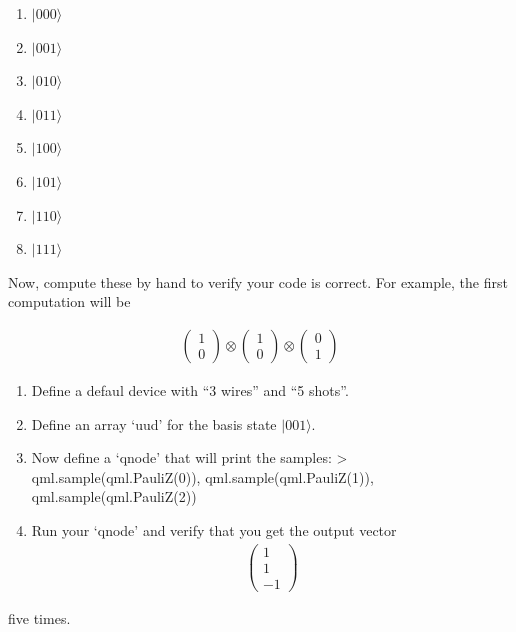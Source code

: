 \documentclass[11pt]{article}
\providecommand{\tightlist}{%
      \setlength{\itemsep}{0pt}\setlength{\parskip}{0pt}}
\begin{document}
\begin{enumerate}
\def\labelenumi{\arabic{enumi}.}
\tightlist
\item
  \(|000 \rangle\)
\item
  \(|001 \rangle\)
\item
  \(|010 \rangle\)
\item
  \(|011 \rangle\)
\item
  \(|100 \rangle\)
\item
  \(|101 \rangle\)
\item
  \(|110 \rangle\)
\item
  \(|111 \rangle\)
\end{enumerate}

Now, compute these by hand to verify your code is correct. For example,
the first computation will be

\begin{align}
\begin{pmatrix} 1\\0 \end{pmatrix} \otimes
\begin{pmatrix} 1\\0 \end{pmatrix} \otimes
\begin{pmatrix} 0\\1 \end{pmatrix}
\end{align}

    \begin{enumerate}
\def\labelenumi{\arabic{enumi}.}
\setcounter{enumi}{8}
\tightlist
\item
  Define a defaul device with ``3 wires'' and ``5 shots''.
\item
  Define an array `uud' for the basis state \(|001\rangle\).
\item
  Now define a `qnode' that will print the samples: \textgreater{}
  qml.sample(qml.PauliZ(0)), qml.sample(qml.PauliZ(1)),
  qml.sample(qml.PauliZ(2))
\item
  Run your `qnode' and verify that you get the output vector
  \begin{align}
  \begin{pmatrix}
  1 \\ 1 \\ -1
  \end{pmatrix}
  \end{align}
\end{enumerate}

five times.
\end{document}
